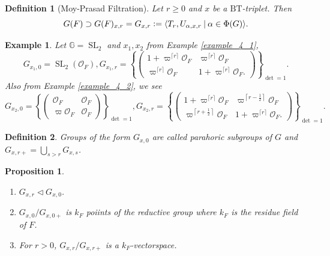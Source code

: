 \documentclass[10pt]{article}
\newtheorem{proposition}{Proposition}[section]
\newtheorem{definition}{Definition}[section]
\newtheorem{example}{Example}[section]
\numberwithin{equation}{theorem}
\DeclareMathOperator{\SL}{SL}
\newcommand{\defeq}{\vcentcolon=}
\newcommand{\Ouv}[0]{\mathcal{O}}
\newcommand{\G}[0]{\mathbb{G}}
\newcommand{\BT}[0]{\mathrm{BT}}
\newcommand{\sep}[0]{\:|\:}
\begin{document}
\begin{definition}[Moy-Prasad Filtration]
    Let $r\geq0$ and $x$ be a $\BT$-triplet. Then 
    \begin{equation*}
        G(F)\supset G(F)_{x,r} = G_{x,r}\defeq \langle T_r,U_{\alpha,x,r}\sep\alpha\in\Phi(G)\rangle.
    \end{equation*}
\end{definition}

\begin{example}
    Let $\G=\SL_2$ and $x_1,x_2$ from Example \ref{example_4_1},
    \begin{equation*}
        G_{x_1,0} = \SL_2(\Ouv_F), G_{x_1,r} = \left\{\begin{pmatrix}
        1+\varpi^{\lceil r\rceil}\Ouv_F & \varpi^{\lceil r\rceil}\Ouv_F \\ \varpi^{\lceil r\rceil}\Ouv_F &1+\varpi^{\lceil r\rceil}\Ouv_F.
        \end{pmatrix}\right\}_{\det=1}.
    \end{equation*}
    Also from Example \ref{example_4_2}, we see 
    \begin{equation*}
        G_{x_2,0} =\left\{\begin{pmatrix}
        \Ouv_F & \Ouv_F \\ \varpi\Ouv_F & \Ouv_F
        \end{pmatrix}\right\}_{\det=1}, G_{x_2,r} = \left\{\begin{pmatrix}
        1+\varpi^{\lceil r\rceil}\Ouv_F & \varpi^{\left\lceil r-{\frac 1 2}\right\rceil}\Ouv_F \\ \varpi^{\left\lceil r+{\frac 1 2}\right\rceil}\Ouv_F &1+\varpi^{\lceil r\rceil}\Ouv_F.
        \end{pmatrix}\right\}_{\det=1}.
    \end{equation*}
\end{example}

\begin{definition}
    Groups of the form $G_{x,0}$ are called parahoric subgroups of $G$ and $G_{x,r+}=\bigcup_{s>r}G_{x,s}$. 
\end{definition}

\begin{proposition}$\:$
    \begin{enumerate}
        \item $G_{x,r}\triangleleft G_{x,0}$.
        \item $G_{x,0}/G_{x,0+}$ is $k_F$ poiints of the reductive group where $k_F$ is the residue field of $F$.
        \item For $r>0$, $G_{x,r}/G_{x,r+}$ is a $k_F$-vectorspace.
    \end{enumerate}
\end{proposition}
\end{document}
